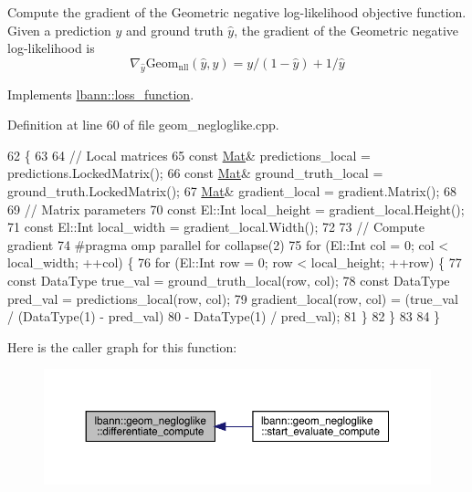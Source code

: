 Compute the gradient of the Geometric negative log-\/likelihood objective function. Given a prediction $y$ and ground truth $\hat{y}$, the gradient of the Geometric negative log-\/likelihood is \[ \nabla_{\hat{y}} \text{Geom}_{\text{nll}} (\hat{y},y) = y/(1-\hat{y}) + 1/\hat{y} \] 

Implements \hyperlink{classlbann_1_1loss__function_aefccc2b4f5a02664002d12630cf369e7}{lbann\+::loss\+\_\+function}.



Definition at line 60 of file geom\+\_\+negloglike.\+cpp.


\begin{DoxyCode}
62                                                                   \{
63 
64   \textcolor{comment}{// Local matrices}
65   \textcolor{keyword}{const} \hyperlink{base_8hpp_a68f11fdc31b62516cb310831bbe54d73}{Mat}& predictions\_local = predictions.LockedMatrix();
66   \textcolor{keyword}{const} \hyperlink{base_8hpp_a68f11fdc31b62516cb310831bbe54d73}{Mat}& ground\_truth\_local = ground\_truth.LockedMatrix();
67   \hyperlink{base_8hpp_a68f11fdc31b62516cb310831bbe54d73}{Mat}& gradient\_local = gradient.Matrix();
68 
69   \textcolor{comment}{// Matrix parameters}
70   \textcolor{keyword}{const} El::Int local\_height = gradient\_local.Height();
71   \textcolor{keyword}{const} El::Int local\_width = gradient\_local.Width();
72 
73   \textcolor{comment}{// Compute gradient}
74 \textcolor{preprocessor}{  #pragma omp parallel for collapse(2)}
75   \textcolor{keywordflow}{for} (El::Int col = 0; col < local\_width; ++col) \{
76     \textcolor{keywordflow}{for} (El::Int row = 0; row < local\_height; ++row) \{
77       \textcolor{keyword}{const} DataType true\_val = ground\_truth\_local(row, col);
78       \textcolor{keyword}{const} DataType pred\_val = predictions\_local(row, col);
79       gradient\_local(row, col) = (true\_val / (DataType(1) - pred\_val)
80                                   - DataType(1) / pred\_val);
81     \}
82   \}
83 
84 \}
\end{DoxyCode}
Here is the caller graph for this function\+:\nopagebreak
\begin{figure}[H]
\begin{center}
\leavevmode
\includegraphics[width=350pt]{classlbann_1_1geom__negloglike_ac87d97a78cc3bb00f976bcd604fc72d7_icgraph}
\end{center}
\end{figure}
\mbox{\label{classlbann_1_1geom__negloglike_a320ac2f029e0a43640878bc052bf5299}} 
